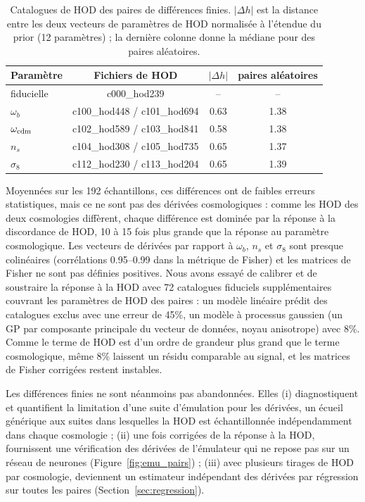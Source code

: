 \documentclass[11pt,twocolumn]{article}
\begin{document}
\begin{table}[!htbp]
\centering\small
\begin{tabular}{lccc}
\toprule
Paramètre & Fichiers de HOD & $|\Delta h|$ & paires aléatoires \\
\midrule
fiducielle & c000\_hod239 & -- & -- \\
$\omega_b$ & c100\_hod448 / c101\_hod694 & 0.63 & 1.38 \\
$\omega_{\rm cdm}$ & c102\_hod589 / c103\_hod841 & 0.58 & 1.38 \\
$n_s$ & c104\_hod308 / c105\_hod735 & 0.65 & 1.37 \\
$\sigma_8$ & c112\_hod230 / c113\_hod204 & 0.65 & 1.39 \\
\bottomrule
\end{tabular}
\caption{Catalogues de HOD des paires de différences finies. $|\Delta h|$ est la distance entre les deux vecteurs de paramètres de HOD normalisée à l'étendue du prior (12 paramètres) ; la dernière colonne donne la médiane pour des paires aléatoires.}
\label{tab:hods}
\end{table}

Moyennées sur les 192 échantillons, ces différences ont de faibles erreurs statistiques, mais ce ne sont pas des dérivées cosmologiques : comme les HOD des deux cosmologies diffèrent, chaque différence est dominée par la réponse à la discordance de HOD, 10 à 15 fois plus grande que la réponse au paramètre cosmologique. Les vecteurs de dérivées par rapport à $\omega_b$, $n_s$ et $\sigma_8$ sont presque colinéaires (corrélations 0.95--0.99 dans la métrique de Fisher) et les matrices de Fisher ne sont pas définies positives. Nous avons essayé de calibrer et de soustraire la réponse à la HOD avec 72 catalogues fiduciels supplémentaires couvrant les paramètres de HOD des paires : un modèle linéaire prédit des catalogues exclus avec une erreur de 45\%, un modèle à processus gaussien (un GP par composante principale du vecteur de données, noyau anisotrope) avec 8\%. Comme le terme de HOD est d'un ordre de grandeur plus grand que le terme cosmologique, même 8\% laissent un résidu comparable au signal, et les matrices de Fisher corrigées restent instables.

Les différences finies ne sont néanmoins pas abandonnées. Elles (i) diagnostiquent et quantifient la limitation d'une suite d'émulation pour les dérivées, un écueil générique aux suites dans lesquelles la HOD est échantillonnée indépendamment dans chaque cosmologie ; (ii) une fois corrigées de la réponse à la HOD, fournissent une vérification des dérivées de l'émulateur qui ne repose pas sur un réseau de neurones (Figure~\ref{fig:emu_pairs}) ; (iii) avec plusieurs tirages de HOD par cosmologie, deviennent un estimateur indépendant des dérivées par régression sur toutes les paires (Section~\ref{sec:regression}).
\end{document}
